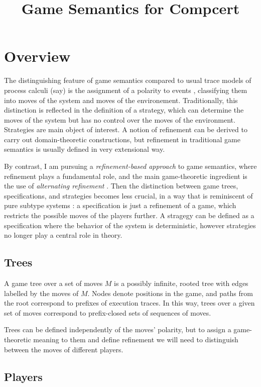 \documentclass{article}
\title{Game Semantics for Compcert}
\begin{document}
\maketitle

\section{Overview}

The distinguishing feature of game semantics
compared to usual trace models of process calculi (say)
is the assignment of a polarity to events \cite{cspgs},
classifying them into moves of the system
and moves of the environement.
Traditionally,
this distinction is reflected in the definition of a strategy,
which can determine the moves of the system
but has no control over the moves of the environment.
Strategies are main object of interest.
A notion of refinement can be derived
to carry out domain-theoretic constructions,
but refinement in traditional game semantics
is usually defined in very extensional way.

By contrast,
I am pursuing a \emph{refinement-based approach} to game semantics,
where refinement plays a fundamental role,
and the main game-theoretic ingredient is the use of
\emph{alternating refinement} \cite{altref}.
Then
the distinction between game trees, specifications, and strategies
becomes less crucial,
in a way that is reminiscent of pure subtype systems \cite{pts}:
a specification is just a refinement of a game,
which restricts the possible moves of the players further.
A stragegy can be defined as
a specification where the behavior of the system is deterministic,
however strategies no longer play a central role in theory.

\subsection{Trees}

A game tree over a set of moves $M$
is a possibly infinite, rooted tree
with edges labelled by the moves of $M$.
Nodes denote positions in the game, and
paths from the root correspond to
prefixes of execution traces.
In this way, trees over a given set of moves
correspond to prefix-closed sets of sequences of moves.

Trees can be defined
independently of the moves' polarity,
but to assign a game-theoretic meaning to them
and define refinement
we will need to distinguish between
the moves of different players.

\subsection{Players}
\end{document}
